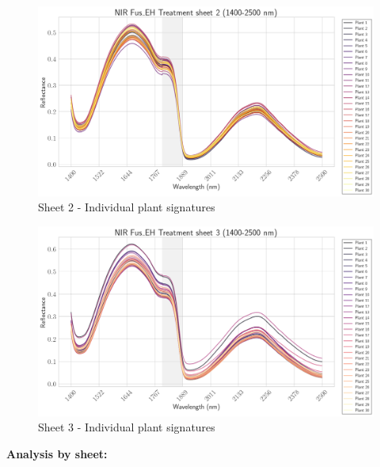 \documentclass[12pt,a4paper]{article}
\begin{document}
\begin{figure}[H]
    \centering

    \includegraphics[width=\textwidth]{Plots/FusEH_Sheet2_Individual.png}
    \caption{Sheet 2 - Individual plant signatures}
    \label{fig:fus_eh_sheet2}

\end{figure}

\begin{figure}[H]
    \centering

    \includegraphics[width=\textwidth]{Plots/FusEH_Sheet3_Individual.png}
    \caption{Sheet 3 - Individual plant signatures}
    \label{fig:fus_eh_sheet3}

\end{figure}

\textbf{Analysis by sheet:}
\end{document}
